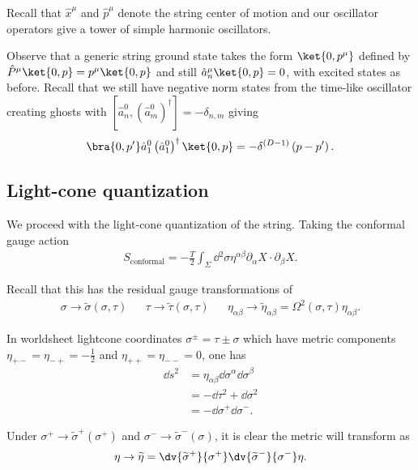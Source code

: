 
Recall that $\hat{x}^{\mu}$ and $\hat{p}^{\mu}$ denote the string center of motion and our oscillator operators give a tower of simple harmonic oscillators.

Observe that a generic string ground state takes the form $\ket{0, p^{\mu}}$ defined by $\hat{P}^{\mu} \ket{0, p} = p^{\mu} \ket{0, p}$ and still $\hat{a}^{\mu}_n \ket{0,p}= 0$, with excited states as before. Recall that we still have negative norm states from the time-like oscillator creating ghosts with $\left[ \hat{a}^{0}_n, \left( {\hat{a}^{0}_m} \right)^{\dag}  \right] = - \delta_{n,m}$ giving
\begin{align}
    \bra{0, p'} \hat{a}^{0}_1 \left( {\hat{a}^{0}_1} \right)^{\dag} \ket{0, p} = - \delta^{\left( D-1 \right) } \left( p - p' \right) 
.\end{align}

\subsection{Light-cone quantization}

We proceed with the light-cone quantization of the string. Taking the conformal gauge action
\begin{align}
    S_\text{conformal} = - \frac{T}{2} \int_\Sigma \dd{^2 \sigma} \eta^{\alpha \beta} \partial_\alpha X \cdot \partial_\beta X
.\end{align}

Recall that this has the residual gauge transformations of
\begin{align}
    \sigma \to \widetilde{\sigma}\left( \sigma, \tau \right) && \tau \to \widetilde{\tau}\left( \sigma, \tau \right)  && \eta_{\alpha \beta} \to \widetilde{\eta}_{\alpha \beta} = \Omega^2 \left( \sigma, \tau \right) \eta_{\alpha \beta}
.\end{align}

In worldsheet lightcone coordinates $\sigma^{\pm} = \tau \pm \sigma$ which have metric components $\eta_{+-} = \eta_{-+} = -\frac{1}{2}$ and $\eta_{++} = \eta_{--} = 0$, one has
\begin{align}
    \dd{s}^2 &= \eta_{\alpha \beta} \dd{\sigma}^{\alpha} \dd{\sigma}^{\beta} \\ 
    &= -\dd{\tau}^2 + \dd{\sigma}^2 \\
    &= -\dd{\sigma}^{+} \dd{\sigma}^{-} 
.\end{align}

Under $\sigma^{+} \to \widetilde{\sigma}^{+}\left( \sigma^{+} \right) $ and $\sigma^{-} \to \widetilde{\sigma}^{-} \left( \sigma \right) $, it is clear the metric will transform as
\begin{align}
    \eta \to \widetilde{\eta} = \dv{\widetilde{\sigma}^{+}}{\sigma^{+}} \dv{\widetilde{\sigma}^{-}}{\sigma^{-}} \eta
.\end{align}

